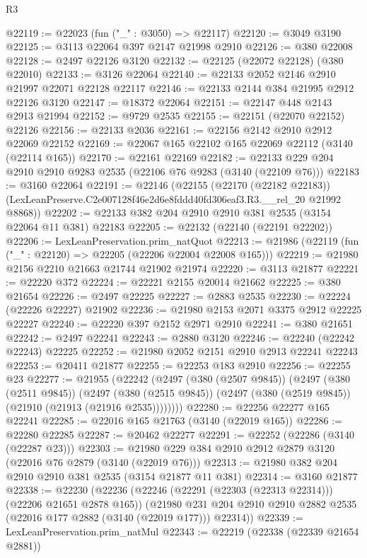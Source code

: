 \begin{lexlean}{R3}
\begin{coremodule}
@22119 := @22023 (fun ("_" : @3050) => @22117)
@22120 := @3049 @3190
@22125 := @3113 @22064 @397 @2147 @21998 @2910
@22126 := @380 @22008
@22128 := @2497 @22126 @3120
@22132 := @22125 (@22072 @22128) (@380 @22010)
@22133 := @3126 @22064
@22140 := @22133 @2052 @2146 @2910 @21997 @22071 @22128 @22117
@22146 := @22133 @2144 @384 @21995 @2912 @22126 @3120
@22147 := @18372 @22064
@22151 := @22147 @448 @2143 @2913 @21994
@22152 := @9729 @2535
@22155 := @22151 (@22070 @22152) @22126
@22156 := @22133 @2036
@22161 := @22156 @2142 @2910 @2912 @22069 @22152
@22169 := @22067 @165 @22102 @165 @22069 @22112 (@3140 (@22114 @165))
@22170 := @22161 @22169
@22182 := @22133 @229 @204 @2910 @2910 @9283 @2535 (@22106 @76 @9283 (@3140 (@22109 @76)))
@22183 := @3160 @22064
@22191 := @22146
    (@22155
      (@22170 (@22182 @22183))
      (LexLeanPreserve.C2e007128f46e2d6e8fddd40fd306eaf3.R3.__rel_20 @21992 @8868))
@22202 := @22133 @382 @204 @2910 @2910 @381 @2535 (@3154 @22064 @11 @381) @22183
@22205 := @22132 (@22140 (@22191 @22202))
@22206 := LexLeanPreservation.prim_natQuot
@22213 := @21986 (@22119 (fun ("_" : @22120) => @22205 (@22206 @22004 @22008 @165)))
@22219 := @21980 @2156 @2210 @21663 @21744 @21902 @21974
@22220 := @3113 @21877
@22221 := @22220 @372
@22224 := @22221 @2155 @20014 @21662
@22225 := @380 @21654
@22226 := @2497 @22225
@22227 := @2883 @2535
@22230 := @22224 (@22226 @22227) @21902
@22236 := @21980 @2153 @2071 @3375 @2912 @22225 @22227
@22240 := @22220 @397 @2152 @2971 @2910
@22241 := @380 @21651
@22242 := @2497 @22241
@22243 := @2880 @3120
@22246 := @22240 (@22242 @22243) @22225
@22252 := @21980 @2052 @2151 @2910 @2913 @22241 @22243
@22253 := @20411 @21877
@22255 := @22253 @183 @2910
@22256 := @22255 @23
@22277 := @21955
    (@22242
      (@2497
        (@380 (@2507 @9845))
        (@2497
          (@380 (@2511 @9845))
          (@2497
            (@380 (@2515 @9845))
            (@2497 (@380 (@2519 @9845)) (@21910 (@21913 (@21916 @2535))))))))
@22280 := @22256 @22277 @165 @22241
@22285 := @22016 @165 @21763 (@3140 (@22019 @165))
@22286 := @22280 @22285
@22287 := @20462 @22277
@22291 := @22252 (@22286 (@3140 (@22287 @23)))
@22303 := @21980 @229 @384 @2910 @2912 @2879 @3120 (@22016 @76 @2879 (@3140 (@22019 @76)))
@22313 := @21980 @382 @204 @2910 @2910 @381 @2535 (@3154 @21877 @11 @381)
@22314 := @3160 @21877
@22338 := @22230
    (@22236
      (@22246 (@22291 (@22303 (@22313 @22314))) (@22206 @21651 @2878 @165))
      (@21980 @231 @204 @2910 @2910 @2882 @2535 (@22016 @177 @2882 (@3140 (@22019 @177))) @22314))
@22339 := LexLeanPreservation.prim_natMul
@22343 := @22219 (@22338 (@22339 @21654 @2881))

\end{coremodule}
\end{lexlean}
